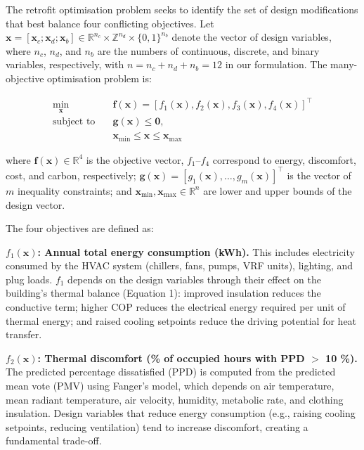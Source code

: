 \documentclass[11pt]{article}
\begin{document}
The retrofit optimisation problem seeks to identify the set of design modifications that best balance four conflicting objectives. Let $\mathbf{x} = [\mathbf{x}_c; \mathbf{x}_d; \mathbf{x}_b] \in \mathbb{R}^{n_c} \times \mathbb{Z}^{n_d} \times \{0,1\}^{n_b}$ denote the vector of design variables, where $n_c$, $n_d$, and $n_b$ are the numbers of continuous, discrete, and binary variables, respectively, with $n = n_c + n_d + n_b = 12$ in our formulation. The many-objective optimisation problem is:

\begin{equation}
\begin{aligned}
\min_{\mathbf{x}} \quad & \mathbf{f}(\mathbf{x}) = [f_1(\mathbf{x}), f_2(\mathbf{x}), f_3(\mathbf{x}), f_4(\mathbf{x})]^\top \\
\text{subject to} \quad & \mathbf{g}(\mathbf{x}) \leq \mathbf{0}, \\
& \mathbf{x}_{\text{min}} \leq \mathbf{x} \leq \mathbf{x}_{\text{max}}
\end{aligned}
\end{equation}

where $\mathbf{f}(\mathbf{x}) \in \mathbb{R}^4$ is the objective vector, $f_1$--$f_4$ correspond to energy, discomfort, cost, and carbon, respectively; $\mathbf{g}(\mathbf{x}) = [g_1(\mathbf{x}),\ldots,g_m(\mathbf{x})]^\top$ is the vector of $m$ inequality constraints; and $\mathbf{x}_{\text{min}},\mathbf{x}_{\text{max}} \in \mathbb{R}^n$ are lower and upper bounds of the design vector.

The four objectives are defined as:

\textbf{$f_1(\mathbf{x})$: Annual total energy consumption (kWh).} This includes electricity consumed by the HVAC system (chillers, fans, pumps, VRF units), lighting, and plug loads. $f_1$ depends on the design variables through their effect on the building's thermal balance (Equation 1): improved insulation reduces the conductive term; higher COP reduces the electrical energy required per unit of thermal energy; and raised cooling setpoints reduce the driving potential for heat transfer.

\textbf{$f_2(\mathbf{x})$: Thermal discomfort (\% of occupied hours with PPD $>$ 10 \%).} The predicted percentage dissatisfied (PPD) is computed from the predicted mean vote (PMV) using Fanger's model, which depends on air temperature, mean radiant temperature, air velocity, humidity, metabolic rate, and clothing insulation. Design variables that reduce energy consumption (e.g., raising cooling setpoints, reducing ventilation) tend to increase discomfort, creating a fundamental trade-off.
\end{document}
